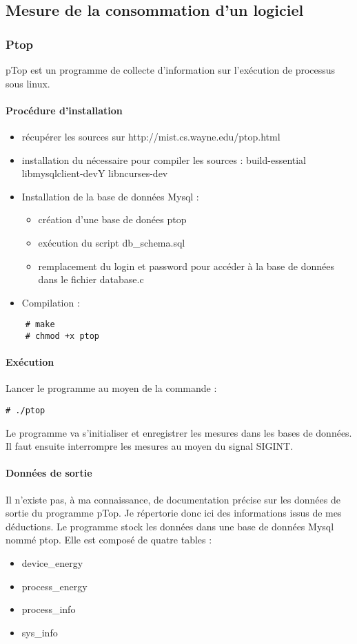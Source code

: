 \documentclass[a4paper, 11pt]{report}
\begin{document}
\subsection{Mesure de la consommation d'un logiciel}
\subsubsection{Ptop}
pTop est un programme de collecte d’information sur l'exécution de processus sous linux.
\paragraph{Procédure d'installation}
\begin{itemize}
	\item récupérer les sources sur http://mist.cs.wayne.edu/ptop.html
	\item installation du nécessaire pour compiler les sources : build-essential libmysqlclient-devY libncurses-dev
	\item Installation de la base de données Mysql :
	\begin{itemize}
		\item création d’une base de donées ptop
		\item exécution du script db\_schema.sql
		\item remplacement du login et password pour accéder à la base de données dans le fichier database.c
	\end{itemize}
	\item Compilation :

\end{itemize}
\begin{verbatim}
	# make
	# chmod +x ptop
\end{verbatim}

\paragraph{Exécution}
Lancer le programme au moyen de la commande :

\begin{verbatim}
# ./ptop
\end{verbatim}

Le programme va s'initialiser et enregistrer les mesures dans les bases de données. Il faut ensuite interrompre les mesures au moyen du signal SIGINT.

\paragraph{Données de sortie}
Il n’existe pas, à ma connaissance, de documentation précise sur les données de sortie du programme pTop. Je répertorie donc ici des informations issus de mes déductions. Le programme stock les données dans une base de données Mysql nommé ptop. Elle est composé de quatre tables :
\begin{itemize}
	\item device\_energy
	\item process\_energy
	\item process\_info
	\item sys\_info
\end{itemize}
\end{document}
